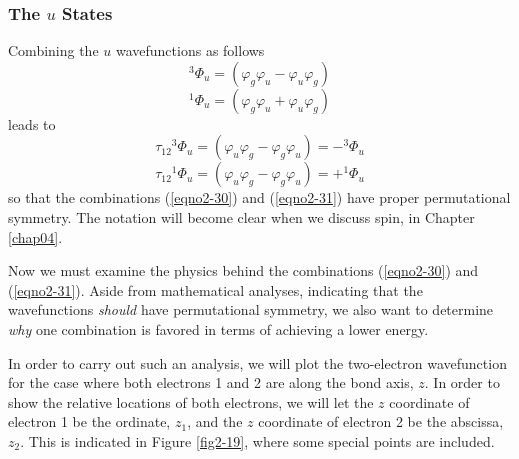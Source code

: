 \subsubsection{The $u$ States}

Combining the $u$ wavefunctions as follows
\begin{equation}
{^3}\Phi_u = \left( \varphi_g \varphi_u - \varphi_u \varphi_g 
\right)
\label{eqno2-30}
\end{equation}
\begin{equation}
{^1}\Phi_u = \left( \varphi_g \varphi_u + \varphi_u \varphi_g 
\right)
\label{eqno2-31}
\end{equation}
leads to
\begin{equation}
\tau_{12} {^3}\Phi_u = \left( \varphi_u \varphi_g - \varphi_g \varphi_u 
\right) = - {^3}\Phi_u
\end{equation}
\begin{equation}
\tau_{12} {^1}\Phi_u = \left( \varphi_u \varphi_g - \varphi_g \varphi_u 
\right) = + ^1\Phi_u
\end{equation}
so that the combinations (\ref{eqno2-30}) and (\ref{eqno2-31}) have
proper permutational symmetry. The notation will become clear when we
discuss spin, in Chapter \ref{chap04}.
    
Now we must examine the physics behind the combinations
(\ref{eqno2-30}) and (\ref{eqno2-31}). Aside from mathematical
analyses, indicating that the wavefunctions \emph{should} have
permutational symmetry, we also want to determine \emph{why} one
combination is favored in terms of achieving a lower energy.
    
In order to carry out such an analysis, we will plot the two-electron
wavefunction for the case where both electrons 1 and 2 are along the
bond axis, $z$. In order to show the relative locations of both
electrons, we will let the $z$ coordinate of electron 1 be the
ordinate, $z_1$, and the $z$ coordinate of electron 2 be the abscissa,
$z_2$. This is indicated in Figure \ref{fig2-19}, where some special
points are included.

